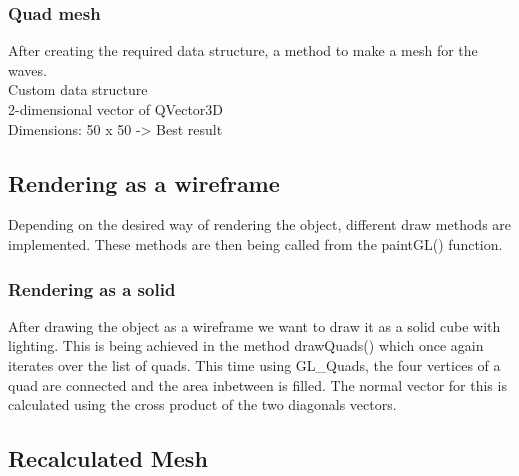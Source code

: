 \documentclass[12pt,a4paper]{scrartcl}
\begin{document}
\subsubsection{Quad mesh}
After creating the required data structure, a method to make a mesh for the waves.\\
Custom data structure\\
2-dimensional vector of QVector3D\\
Dimensions: 50 x 50 -> Best result\\



\subsection{Rendering as a wireframe}
Depending on the desired way of rendering the object, different draw methods are implemented. These methods are then being called from the paintGL() function.


\subsubsection{Rendering as a solid}
After drawing the object as a wireframe we want to draw it as a solid cube with lighting. This is being achieved in the method drawQuads() which once again iterates over the list of quads. This time using GL_Quads, the four vertices of a quad are connected and the area inbetween is filled. The normal vector for this is calculated using the cross product of the two diagonals vectors.

\subsection{Recalculated Mesh}
\end{document}

